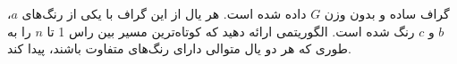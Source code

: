 گراف ساده و بدون وزن $G$ داده شده است. هر یال از این گراف با یکی از رنگ‌های $a$، $b$ و $c$ رنگ شده است. الگوریتمی ارائه دهید که کوتاه‌ترین مسیر بین راس 1 تا $n$ را به طوری که هر دو یال متوالی دارای رنگ‌های متفاوت باشند، پیدا کند.